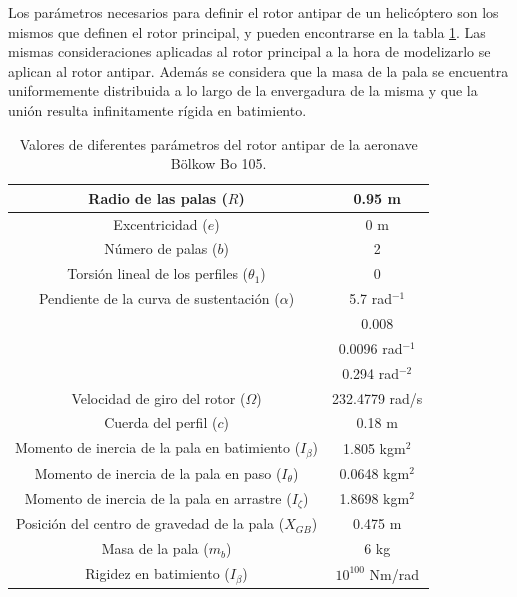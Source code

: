 Los parámetros necesarios para definir el rotor antipar de un helicóptero son los mismos que definen el rotor principal, y pueden encontrarse en la tabla \ref{RaBo}.
Las mismas consideraciones aplicadas al rotor principal a la hora de modelizarlo se aplican al rotor antipar. Además se considera que la masa de la pala se encuentra uniformemente distribuida a lo largo de la envergadura de la misma y que la unión resulta infinitamente rígida en batimiento.
\begin{table}[htbp]
	\centering
	\begin{tabular}{|>{\columncolor{Gray}}c|c|}
		\hline
		Radio de las palas ($R$) & 0.95 m \\ \hline
		Excentricidad ($e$) & 0 m \\ \hline
		Número de palas ($b$) & 2 \\ \hline
		Torsión lineal de los perfiles ($\theta_1$) & \cellcolor[rgb]{ 1,  1,  1}0 \\ \hline
		Pendiente de la curva de sustentación ($\alpha$) & 5.7 rad$^{-1}$ \\ \hline
		\cellcolor{Gray} & 0.008 \\ \cline{2-2}
		\cellcolor{Gray} & 0.0096 rad$^{-1}$ \\ \cline{2-2}
		\multirow{-3}{*}{\cellcolor{Gray}Parámetros de la polar ($\delta_0$, $\delta_1$, $\delta_2$)} & 0.294 rad$^{-2}$ \\ \hline
		Velocidad de giro del rotor ($\Omega$) & \cellcolor[rgb]{ 1,  1,  1}232.4779 rad/s \\ \hline
		Cuerda del perfil ($c$) & \cellcolor[rgb]{ 1,  1,  1}0.18 m \\ \hline
		Momento de inercia de la pala en batimiento ($I_\beta$) & 1.805 kgm$^2$ \\ \hline
		Momento de inercia de la pala en paso ($I_\theta$) & 0.0648 kgm$^2$ \\ \hline
		Momento de inercia de la pala en arrastre ($I_\zeta$) & 1.8698 kgm$^2$ \\ \hline
		Posición del centro de gravedad de la pala ($X_{GB}$) & 0.475 m \\ \hline
		Masa de la pala ($m_b$) & 6 kg \\ \hline
		\cellcolor{Gray}Rigidez en batimiento ($I_\beta$) & $10^{100}$ Nm/rad \\ \hline
	\end{tabular}%
	\caption{Valores de diferentes parámetros del rotor antipar de la aeronave Bölkow Bo 105.}
	\label{RaBo}
\end{table}%

